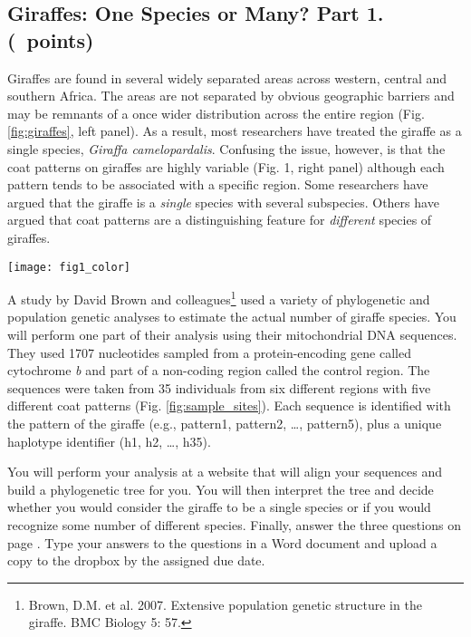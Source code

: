 \documentclass[11pt, addpoints]{exam}
\begin{document}
\subsection*{Giraffes: One Species or Many? Part 1. (\numpoints\ points)}

Giraffes are found in several widely separated areas across western,
central and southern Africa. The areas are not separated by obvious
geographic barriers and may be remnants of a once wider distribution
across the entire region (Fig. \ref{fig:giraffes}, left panel). As a result, most
researchers have treated the giraffe as a single species, \textit{Giraffa
camelopardalis}. Confusing the issue, however, is that the coat patterns
on giraffes are highly variable (Fig. 1, right panel) although each
pattern tends to be associated with a specific region. Some researchers
have argued that the giraffe is a \emph{single} species with several
subspecies. Others have argued that coat patterns are a distinguishing
feature for \emph{different} species of giraffes.

\begin{center}
	\texttt{[image: fig1\_color]}
\end{center}

A study by David Brown and colleagues\footnote{Brown, D.M. et al. 2007.
  Extensive population genetic structure in the giraffe. BMC Biology 5:
  57.} used a variety of phylogenetic and population genetic analyses to
estimate the actual number of giraffe species. You will perform one part
of their analysis using their mitochondrial DNA sequences. They used
1707 nucleotides sampled from a protein-encoding gene called cytochrome
\textit{b} and part of a non-coding region called the control region. The
sequences were taken from 35 individuals from six different regions with
five different coat patterns (Fig. \ref{fig:sample_sites}). Each sequence is identified with
the pattern of the giraffe (e.g., pattern1, pattern2, \ldots{},
pattern5), plus a unique haplotype identifier (h1, h2, \ldots{}, h35).

You will perform your analysis at a website that will align your
sequences and build a phylogenetic tree for you. You will then interpret
the tree and decide whether you would consider the giraffe to be a
single species or if you would recognize some number of different
species. Finally, answer the three questions on page \pageref{sec:questions}. Type your
answers to the questions in a Word document and upload a copy to the dropbox by the assigned due date.
\end{document}
